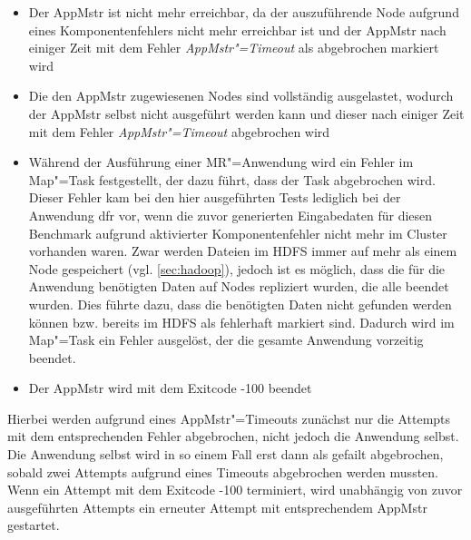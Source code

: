 \begin{itemize}
    \item Der \ac{AppMstr} ist nicht mehr erreichbar, da der auszuführende Node aufgrund eines Komponentenfehlers nicht mehr erreichbar ist und der \ac{AppMstr} nach einiger Zeit mit dem Fehler \emph{\ac{AppMstr}"=Timeout} als abgebrochen markiert wird
    \item Die den \ac{AppMstr} zugewiesenen Nodes sind vollständig ausgelastet, wodurch der \ac{AppMstr} selbst nicht ausgeführt werden kann und dieser nach einiger Zeit mit dem Fehler \emph{\ac{AppMstr}"=Timeout} abgebrochen wird
    \item Während der Ausführung einer \ac{MR}"=Anwendung wird ein Fehler im Map"=Task festgestellt, der dazu führt, dass der Task abgebrochen wird.
    Dieser Fehler kam bei den hier ausgeführten Tests lediglich bei der Anwendung \acl{dfr} vor, wenn die zuvor generierten Eingabedaten für diesen Benchmark aufgrund aktivierter Komponentenfehler nicht mehr im Cluster vorhanden waren.
    Zwar werden Dateien im \ac{HDFS} immer auf mehr als einem Node gespeichert (vgl. \autoref{sec:hadoop}), jedoch ist es möglich, dass die für die Anwendung benötigten Daten auf Nodes repliziert wurden, die alle beendet wurden.
    Dies führte dazu, dass die benötigten Daten nicht gefunden werden können bzw. bereits im \ac{HDFS} als fehlerhaft markiert sind.
    Dadurch wird im Map"=Task ein Fehler ausgelöst, der die gesamte Anwendung vorzeitig beendet.
    \item Der \ac{AppMstr} wird mit dem Exitcode -100 beendet
\end{itemize}

Hierbei werden aufgrund eines \ac{AppMstr}"=Timeouts zunächst nur die Attempts mit dem entsprechenden Fehler abgebrochen, nicht jedoch die Anwendung selbst.
Die Anwendung selbst wird in so einem Fall erst dann als gefailt abgebrochen, sobald zwei Attempts aufgrund eines Timeouts abgebrochen werden mussten.
Wenn ein Attempt mit dem Exitcode -100 terminiert, wird unabhängig von zuvor ausgeführten Attempts ein erneuter Attempt mit entsprechendem \ac{AppMstr} gestartet.

